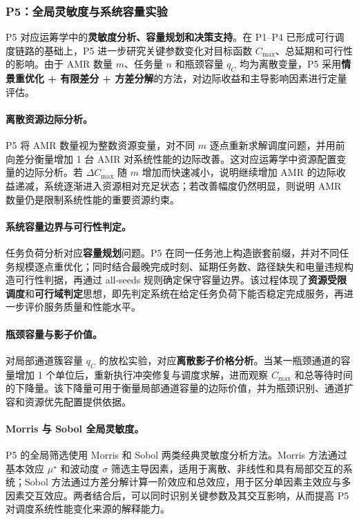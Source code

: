 \subsubsection{P5：全局灵敏度与系统容量实验}

P5 对应运筹学中的\textbf{灵敏度分析、容量规划和决策支持}。在 P1--P4 已形成可行调度链路的基础上，P5 进一步研究关键参数变化对目标函数 $C_{\max}$、总延期和可行性的影响。由于 AMR 数量 $m$、任务量 $n$ 和瓶颈容量 $q_C$ 均为离散变量，P5 采用\textbf{情景重优化 + 有限差分 + 方差分解}的方法，对边际收益和主导影响因素进行定量评估。

\paragraph{离散资源边际分析。}
P5 将 AMR 数量视为整数资源变量，对不同 $m$ 逐点重新求解调度问题，并用前向差分衡量增加 1 台 AMR 对系统性能的边际改善。这对应运筹学中资源配置变量的边际分析。若 $\Delta C_{\max}$ 随 $m$ 增加而快速减小，说明继续增加 AMR 的边际收益递减，系统逐渐进入资源相对充足状态；若改善幅度仍然明显，则说明 AMR 数量仍是限制系统性能的重要资源约束。

\paragraph{系统容量边界与可行性判定。}
任务负荷分析对应\textbf{容量规划}问题。P5 在同一任务池上构造嵌套前缀，并对不同任务规模逐点重优化；同时结合最晚完成时刻、延期任务数、路径缺失和电量违规构造可行性判据，再通过 all-seeds 规则确定保守容量边界。该过程体现了\textbf{资源受限调度}和\textbf{可行域判定}思想，即先判定系统在给定任务负荷下能否稳定完成服务，再进一步评价服务质量和性能水平。

\paragraph{瓶颈容量与影子价值。}
对局部通道簇容量 $q_C$ 的放松实验，对应\textbf{离散影子价格分析}。当某一瓶颈通道的容量增加 1 个单位后，重新执行冲突修复与调度求解，进而观察 $C_{\max}$ 和总等待时间的下降量。该下降量可用于衡量局部通道容量的边际价值，并为瓶颈识别、通道扩容和资源优先配置提供依据。

\paragraph{Morris 与 Sobol 全局灵敏度。}
P5 的全局筛选使用 Morris 和 Sobol 两类经典灵敏度分析方法。Morris 方法通过基本效应 $\mu^\star$ 和波动度 $\sigma$ 筛选主导因素，适用于离散、非线性和具有局部交互的系统；Sobol 方法通过方差分解计算一阶效应和总效应，用于区分单因素主效应与多因素交互效应。两者结合后，可以同时识别关键参数及其交互影响，从而提高 P5 对调度系统性能变化来源的解释能力。
